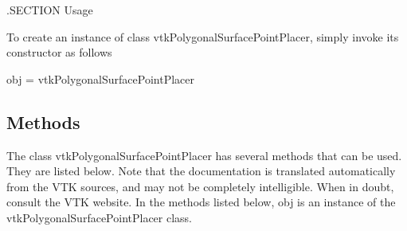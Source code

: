 .S\-E\-C\-T\-I\-O\-N Usage

To create an instance of class vtk\-Polygonal\-Surface\-Point\-Placer, simply invoke its constructor as follows \begin{DoxyVerb}  obj = vtkPolygonalSurfacePointPlacer
\end{DoxyVerb}
 \hypertarget{vtkwidgets_vtkxyplotwidget_Methods}{}\subsection{Methods}\label{vtkwidgets_vtkxyplotwidget_Methods}
The class vtk\-Polygonal\-Surface\-Point\-Placer has several methods that can be used. They are listed below. Note that the documentation is translated automatically from the V\-T\-K sources, and may not be completely intelligible. When in doubt, consult the V\-T\-K website. In the methods listed below, {\ttfamily obj} is an instance of the vtk\-Polygonal\-Surface\-Point\-Placer class. 
